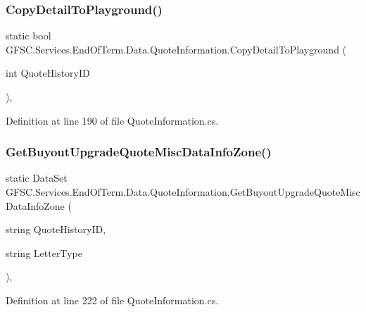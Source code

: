 \subsubsection{\texorpdfstring{Copy\+Detail\+To\+Playground()}{CopyDetailToPlayground()}}
{\footnotesize\ttfamily static bool G\+F\+S\+C.\+Services.\+End\+Of\+Term.\+Data.\+Quote\+Information.\+Copy\+Detail\+To\+Playground (\begin{DoxyParamCaption}\item[{int}]{Quote\+History\+ID }\end{DoxyParamCaption})\hspace{0.3cm}{\ttfamily [static]}, {\ttfamily [package]}}



Definition at line 190 of file Quote\+Information.\+cs.

\mbox{\label{class_g_f_s_c_1_1_services_1_1_end_of_term_1_1_data_1_1_quote_information_a0e5236ce530e10804702d898444ac9dd}} 
\subsubsection{\texorpdfstring{Get\+Buyout\+Upgrade\+Quote\+Misc\+Data\+Info\+Zone()}{GetBuyoutUpgradeQuoteMiscDataInfoZone()}}
{\footnotesize\ttfamily static Data\+Set G\+F\+S\+C.\+Services.\+End\+Of\+Term.\+Data.\+Quote\+Information.\+Get\+Buyout\+Upgrade\+Quote\+Misc\+Data\+Info\+Zone (\begin{DoxyParamCaption}\item[{string}]{Quote\+History\+ID,  }\item[{string}]{Letter\+Type }\end{DoxyParamCaption})\hspace{0.3cm}{\ttfamily [static]}, {\ttfamily [package]}}



Definition at line 222 of file Quote\+Information.\+cs.


